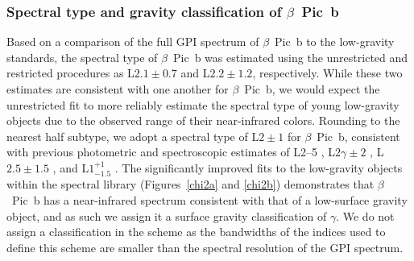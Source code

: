 \documentclass[twocolumn]{aastex6}
\begin{document}
\subsubsection{Spectral type and gravity classification of $\beta$~Pic~b}
Based on a comparison of the full GPI spectrum of $\beta$~Pic~b to the \citet{Allers2013} low-gravity standards, the spectral type of $\beta$~Pic~b was estimated using the unrestricted and restricted procedures as L$2.1\pm0.7$ and L$2.2\pm1.2$, respectively. While these two estimates are consistent with one another for $\beta$~Pic~b, we would expect the unrestricted fit to more reliably estimate the spectral type of young low-gravity objects due to the observed range of their near-infrared colors. Rounding to the nearest half subtype, we adopt a spectral type of L$2\pm1$ for $\beta$~Pic~b, consistent with previous photometric and spectroscopic estimates of L2--5 \citep{Currie2013}, L$2\gamma\pm2$ \citep{Bonnefoy2013}, L$2.5\pm1.5$ \citep{Males2014}, and L$1^{+1}_{-1.5}$ \citep{Bonnefoy2014}. The significantly improved fits to the low-gravity objects within the spectral library (Figures~\ref{chi2a} and \ref{chi2b}) demonstrates that $\beta$~Pic~b has a near-infrared spectrum consistent with that of a low-surface gravity object, and as such we assign it a surface gravity classification of $\gamma$. We do not assign a classification in the \citet{Allers2013} scheme as the bandwidths of the indices used to define this scheme are smaller than the spectral resolution of the GPI spectrum.
\end{document}
